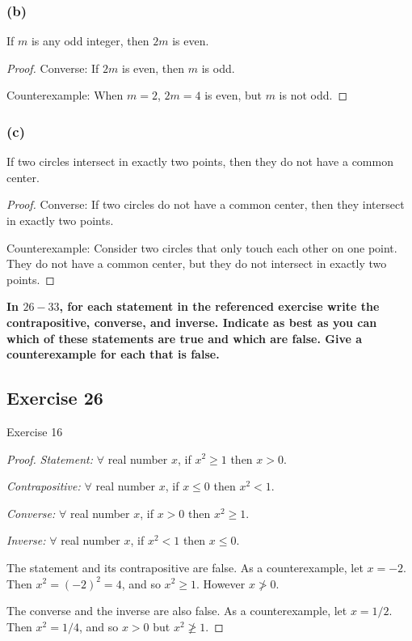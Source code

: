 \documentclass[14pt]{extarticle}
\newcommand{\fa}{\forall}
\begin{document}
\subsubsection{(b)}
If $m$ is any odd integer, then $2m$ is even.

\begin{proof}
Converse: If $2m$ is even, then $m$ is odd.

Counterexample: When $m = 2$, $2m = 4$ is even, but $m$ is not odd.
\end{proof}

\subsubsection{(c)}
If two circles intersect in exactly two points, then they do not have a common center.

\begin{proof}
Converse: If two circles do not have a common center, then they intersect in exactly two points.

Counterexample: Consider two circles that only touch each other on one point. They do not have a common center, but they do not intersect in exactly two points.
\end{proof}

{\bf \color{cyan} In $26-33$, for each statement in the referenced exercise write the contrapositive, converse, and inverse. Indicate as best as you can which of these statements are true and which are false. Give a counterexample for each that is false.}

\subsection{Exercise 26}
Exercise 16 

\begin{proof}
{\it Statement:} $\fa$ real number $x$, if $x^2 \geq 1$ then $x > 0$.

{\it Contrapositive:} $\fa$ real number $x$, if $x \leq 0$ then $x^2 < 1$.

{\it Converse:} $\fa$ real number $x$, if $x > 0$ then $x^2 \geq 1$.

{\it Inverse:} $\fa$ real number $x$, if $x^2 < 1$ then $x \leq 0$.

The statement and its contrapositive are false. As a
counterexample, let $x = -2$. Then $x^2 = (-2)^2 = 4$, and
so $x^2 \geq 1$. However $x \ngtr 0$.

The converse and the inverse are also false. As a counterexample, let $x = 1/2$. Then $x^2 = 1/4$, and so $x > 0$ but $x^2 \ngeq 1$.
\end{proof}
\end{document}
